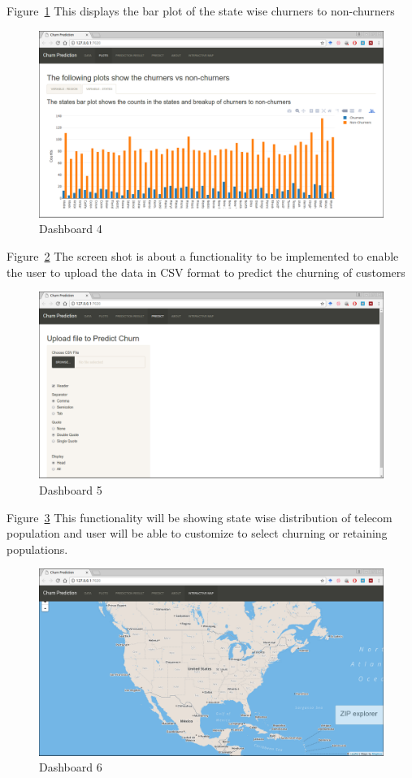 		\newpage
Figure~\ref{icpcr-4} This displays the bar plot of the state wise churners to non-churners
		\begin{figure}[H]
			\caption{Dashboard 4}
			\label{icpcr-4}
			\hspace*{-2cm}
			\includegraphics[scale=0.4]{progress_presentaion/ppt_figures/icpcr_4_dash.png}
		\end{figure}
		\newpage
Figure~\ref{icpcr-5} The screen shot is about a functionality to be implemented to enable the user to upload the data in CSV format to predict the churning of customers
		\begin{figure}[H]
			\caption{Dashboard 5}
			\label{icpcr-5}
			\hspace*{-2cm}
			\includegraphics[scale=0.4]{progress_presentaion/ppt_figures/icpcr_5_dash.png}
		\end{figure}
		\newpage
Figure~\ref{icpcr-6} This functionality will be showing state wise distribution of telecom population and user will be able to customize to select churning or retaining populations.
		\begin{figure}[H]
			\caption{Dashboard 6}
			\label{icpcr-6}
			\hspace*{-2cm}
			\includegraphics[scale=0.4]{progress_presentaion/ppt_figures/icpcr_6_dash.png}
		\end{figure}